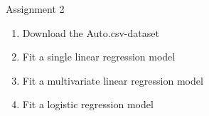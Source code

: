 \begin{frame}{Assignment 2}
    \begin{enumerate}
        \item Download the Auto.csv-dataset
        \item Fit a single linear regression model
        \item Fit a multivariate linear regression model
        \item Fit a logistic regression model
    \end{enumerate}
\end{frame}

